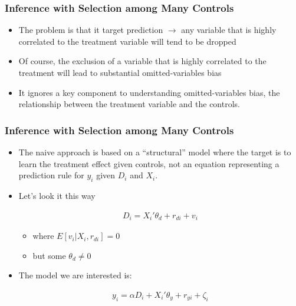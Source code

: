 \documentclass[
  shownotes,
  xcolor={svgnames},
  hyperref={colorlinks,citecolor=DarkBlue,linkcolor=DarkRed,urlcolor=DarkBlue}
  , aspectratio=169]{beamer}
\begin{document}
\begin{frame}[fragile]
\frametitle{Inference with Selection among Many Controls}
\begin{itemize}

\item The problem is that it target prediction $\rightarrow$ any variable that is highly correlated to the treatment variable will tend to be dropped 
\medskip
\item  Of course, the exclusion of a variable that is highly correlated to the treatment will lead to substantial omitted-variables bias 
\medskip
\item It ignores a key component to understanding omitted-variables bias, the relationship between the treatment variable and the controls. 
\medskip

\end{itemize}


\end{frame}
\begin{frame}[fragile]
\frametitle{Inference with Selection among Many Controls}
\begin{itemize}
\item The naive approach is based on a “structural” model where the target is to learn the treatment effect given controls, not an equation representing a prediction rule for $y_i$ given $D_i$ and $X_i$. 
\medskip
\item Let's look it this way

\begin{align}
D_i = X_i'\theta_d + r_{di}+v_i
\end{align}

\begin{itemize}
  \item where $E[v_i|X_i,r_{di}]=0$
  \medskip
  \item but some $\theta_d \neq 0$
\end{itemize}
\item The model we are interested is:

\begin{align}
y_i = \alpha D_i + X_i'\theta_y +r_{yi} + \zeta_i
\end{align}
 

\end{itemize}

\end{frame}
\end{document}
